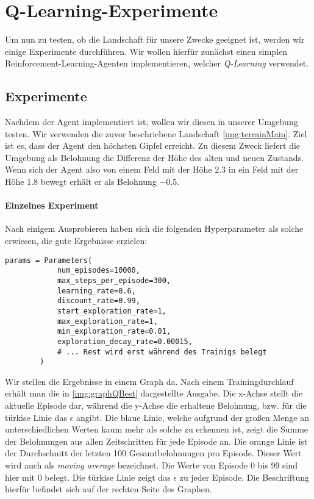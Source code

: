 \section{Q-Learning-Experimente}

Um nun zu testen, ob die Landschaft für unsere Zwecke geeignet ist, werden wir einige Experimente durchführen. Wir wollen hierfür zunächst einen simplen Reinforcement-Learning-Agenten implementieren, welcher \textit{Q-Learning} verwendet.



\subsection{Experimente} \label{sec:qLearningExperiments}
Nachdem der Agent implementiert ist, wollen wir diesen in unserer Umgebung testen. Wir verwenden die zuvor beschriebene Landschaft \ref{img:terrainMain}. Ziel ist es, dass der Agent den höchsten Gipfel erreicht. Zu diesem Zweck liefert die Umgebung als Belohnung die Differenz der Höhe des alten und neuen Zustands. Wenn sich der Agent also von einem Feld mit der Höhe $ 2.3 $ in ein Feld mit der Höhe $ 1.8 $ bewegt erhält er als Belohnung $ -0.5 $.

\paragraph{Einzelnes Experiment}
Nach einigem Ausprobieren haben sich die folgenden Hyperparameter als solche erwiesen, die gute Ergebnisse erzielen:
\begin{verbatim}
params = Parameters(
            num_episodes=10000,
            max_steps_per_episode=300,
            learning_rate=0.6,
            discount_rate=0.99,
            start_exploration_rate=1,
            max_exploration_rate=1,
            min_exploration_rate=0.01,
            exploration_decay_rate=0.00015,
            # ... Rest wird erst während des Trainigs belegt
        )
\end{verbatim}

Wir stellen die Ergebnisse in einem Graph da. Nach einem Trainingdurchlauf erhält man die in \ref{img:graphQBest} dargestellte Ausgabe. Die x-Achse stellt die aktuelle Episode dar, während die y-Achse die erhaltene Belohnung, bzw. für die türkise Linie das $ \epsilon $ angibt. Die blaue Linie, welche aufgrund der großen Menge an unterschiedlichen Werten kaum mehr als solche zu erkennen ist, zeigt die Summe der Belohnungen aus allen Zeitschritten für jede Episode an. Die orange Linie ist der Durchschnitt der letzten 100 Gesamtbelohnungen pro Episode. Dieser Wert wird auch als \textit{moving average} bezeichnet. Die Werte von Episode 0 bis 99 sind hier mit 0 belegt. Die türkise Linie zeigt das $ \epsilon $ zu jeder Episode. Die Beschriftung hierfür befindet sich auf der rechten Seite des Graphen.

